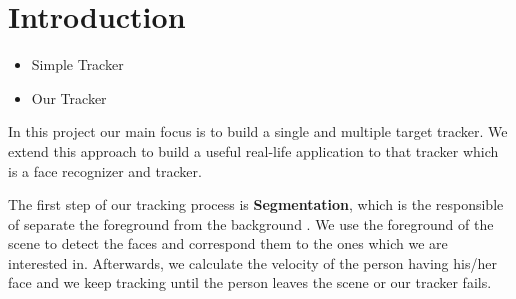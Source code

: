 \section{Introduction}

\begin{itemize}
\item Simple Tracker \\ 


\item Our Tracker\\ 



\end{itemize}

In this project our main focus is to build a single and multiple target tracker. We extend this approach to build a useful real-life application to that tracker which is a face recognizer and tracker.

The first step of our tracking process is \textbf{Segmentation}, which is the responsible of separate the foreground from the background . We use the foreground of the scene to detect the faces and correspond them to the ones which we are interested in. Afterwards, we calculate the velocity of the person having his/her face and we keep tracking until the person leaves the scene or our tracker fails.
